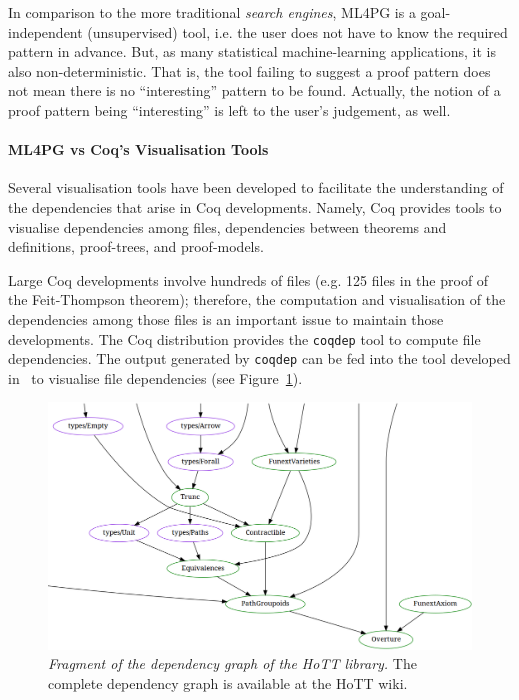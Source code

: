 In comparison to the more traditional \emph{search engines}, ML4PG is a goal-independent (unsupervised) tool, i.e. the user does not have to know the required pattern in advance. But, as many statistical machine-learning applications, it is also non-deterministic. That is, the tool failing to suggest a proof pattern does not mean there is no ``interesting'' pattern to be found. Actually, the notion of a proof pattern being ``interesting'' is left to the user's judgement, as well.

\paragraph{ML4PG vs Coq's Visualisation Tools} Several visualisation tools have been developed to facilitate the understanding
of the dependencies that arise in Coq developments. Namely, Coq provides tools to visualise dependencies among files, dependencies
between theorems and definitions, proof-trees, and proof-models.

Large Coq developments involve hundreds of files (e.g. 125 files in the proof of the Feit-Thompson theorem); therefore, the
computation and visualisation of the dependencies among those files is an important issue to maintain those developments. The
Coq distribution provides the \lstinline?coqdep? tool to compute file dependencies. The output generated by \lstinline?coqdep?
can be fed into the tool developed in~\cite{dependtohtml} to visualise file dependencies (see Figure~\ref{fig:depend-files}).

\begin{figure}[t]
\centering
\includegraphics[scale=.4]{HoTTCorefragment.png}
\caption{\scriptsize{\emph{Fragment of the dependency graph of the HoTT library.} The complete dependency graph is available at the HoTT wiki\protect\cite{hottbook}.}}\label{fig:depend-files}
\end{figure}

